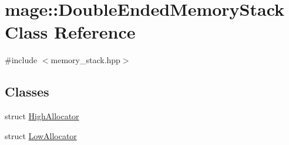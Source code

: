 \hypertarget{classmage_1_1_double_ended_memory_stack}{}\section{mage\+:\+:Double\+Ended\+Memory\+Stack Class Reference}
\label{classmage_1_1_double_ended_memory_stack}


{\ttfamily \#include $<$memory\+\_\+stack.\+hpp$>$}

\subsection*{Classes}
\begin{DoxyCompactItemize}
\item 
struct \hyperlink{structmage_1_1_double_ended_memory_stack_1_1_high_allocator}{High\+Allocator}
\item 
struct \hyperlink{structmage_1_1_double_ended_memory_stack_1_1_low_allocator}{Low\+Allocator}
\end{DoxyCompactItemize}
